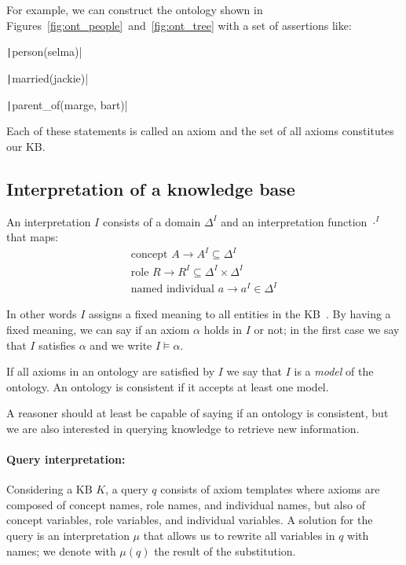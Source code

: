 For example, we can construct the ontology shown in Figures~\ref{fig:ont_people}~and~\ref{fig:ont_tree} with a set of assertions like:\\
\begin{minipage}{\linewidth}
	\hspace{.5cm}
	\begin{minipage}{.27\linewidth}
		\texttt|person(selma)|
	\end{minipage}
	\begin{minipage}{.3\linewidth}
		\texttt|married(jackie)|
	\end{minipage}
	\begin{minipage}{.2\linewidth}
		\texttt|parent_of(marge, bart)|
	\end{minipage}
\end{minipage}
Each of these statements is called an axiom and the set of all axioms constitutes our KB.

\subsection{Interpretation of a knowledge base}
An interpretation $\mathit{I}$ consists of a domain $\Delta^\mathit{I}$ and an interpretation function $\cdot^\mathit{I}$ that maps:
\begin{gather*}
	\text{concept } A \rightarrow A^\mathit{I} \subseteq \Delta^\mathit{I}\\
	\text{role } R \rightarrow R^\mathit{I} \subseteq \Delta^\mathit{I} \times \Delta^\mathit{I}\\
	\text{named individual } a \rightarrow a^\mathit{I} \in \Delta^\mathit{I}
\end{gather*}

In other words $\mathit{I}$ assigns a fixed meaning to all entities in the KB~\cite{krotzsch2012description}. By having a fixed meaning, we can say if an axiom $\alpha$ holds in $\mathit{I}$ or not; in the first case we say that $\mathit{I}$ satisfies $\alpha$ and we write $\mathit{I} \models \alpha$. 

If all axioms in an ontology are satisfied by $\mathit{I}$ we say that $\mathit{I}$ is a \emph{model} of the ontology. An ontology is consistent if it accepts at least one model.

A reasoner should at least be capable of saying if an ontology is consistent, but we are also interested in querying knowledge to retrieve new information.

\paragraph{Query interpretation:} Considering a KB $\mathit{K}$, a query $q$ consists of axiom templates where  axioms are composed of concept names, role names, and individual names, but also of concept variables, role variables, and individual variables. A solution for the query is an interpretation $\mu$ that allows us to rewrite all variables in $q$ with names; we denote with $\mu(q)$ the result of the substitution. 

